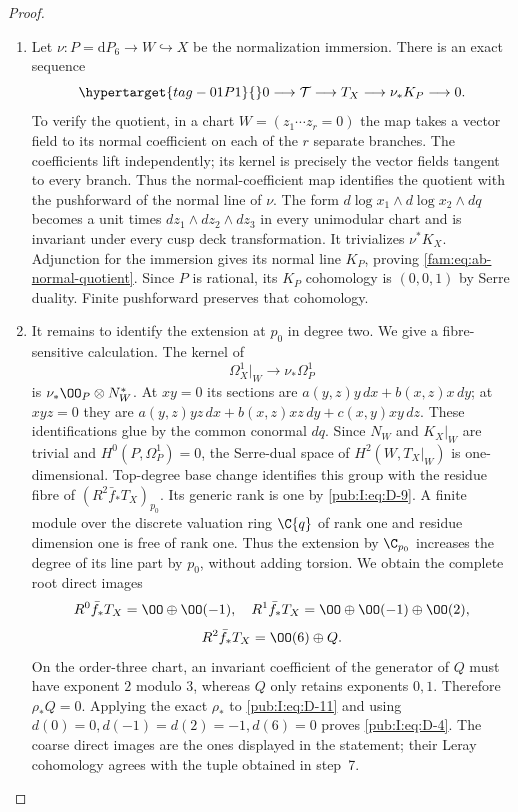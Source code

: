 \begin{proof}
\begin{enumerate}[label=\arabic*.,leftmargin=*]
\begin{enumerate}[label=(\alph*),leftmargin=*]
\item Let $\nu:P=\mathrm dP_6\to W\hookrightarrow X$ be the normalization
immersion. There is an exact sequence
\begin{equation}
 \hypertarget{tag-01P1}{}\label{fam:eq:ab-normal-quotient}
0\longrightarrow\mathcal T\longrightarrow T_X
 \longrightarrow\nu_*K_P\longrightarrow0.             
\end{equation}
To verify the quotient, in a chart $W=(z_1\cdots z_r=0)$ the map takes
a vector field to its normal coefficient on each of the $r$ separate
branches. The coefficients lift independently; its kernel is precisely
the vector fields tangent to every branch. Thus the normal-coefficient map identifies the quotient with
the pushforward of the normal line of $\nu$.
The form $d\log x_1\wedge d\log x_2\wedge dq$ becomes a unit times
$dz_1\wedge dz_2\wedge dz_3$ in every unimodular chart and is invariant
under every cusp deck transformation. It trivializes $\nu^*K_X$.
Adjunction for the immersion gives its normal line $K_P$, proving
\eqref{fam:eq:ab-normal-quotient}. Since $P$ is rational, its $K_P$ cohomology is $(0,0,1)$ by
Serre duality. Finite pushforward preserves that cohomology.

\item It remains to identify the extension at $p_0$ in degree two. We give
a fibre-sensitive calculation. The kernel of
\[
 \Omega_X^1|_W\longrightarrow\nu_*\Omega_P^1
\]
is $\nu_*\OO_P\otimes N_W^*$. At $xy=0$ its sections are
$a(y,z)y\,dx+b(x,z)x\,dy$; at $xyz=0$ they are
$a(y,z)yz\,dx+b(x,z)xz\,dy+c(x,y)xy\,dz$.
These identifications glue by the common conormal $dq$.
Since $N_W$ and $K_X|_W$ are trivial and $H^0(P,\Omega_P^1)=0$, the
Serre-dual space of $H^2(W,T_X|_W)$ is one-dimensional.
Top-degree base change identifies this group with the residue fibre
of $(R^2\bar f_*T_X)_{p_0}$. Its generic rank is one by \eqref{pub:I:eq:D-9}.
A finite module over the discrete valuation ring $\C\{q\}$ of rank
one and residue dimension one is free of rank one. Thus the extension
by $\C_{p_0}$ increases the degree of its line part by $p_0$, without
adding torsion. We obtain the complete root direct images
\[
 R^0\bar f_*T_X=\OO\oplus\OO(-1),\quad
 R^1\bar f_*T_X=\OO\oplus\OO(-1)\oplus\OO(2),
\]
\begin{equation}
 R^2\bar f_*T_X=\OO(6)\oplus Q.
\label{pub:I:eq:D-11}
\end{equation}
On the order-three chart, an invariant coefficient of the generator
of $Q$ must have exponent $2$ modulo $3$, whereas $Q$ only retains
exponents $0,1$. Therefore $\rho_*Q=0$. Applying the exact $\rho_*$
to \eqref{pub:I:eq:D-11} and using
$d(0)=0,d(-1)=d(2)=-1,d(6)=0$ proves \eqref{pub:I:eq:D-4}.
The coarse direct images are the ones displayed in the statement;
their Leray cohomology agrees with the tuple obtained in step~7.
\end{enumerate}
\end{enumerate}
\end{proof}
